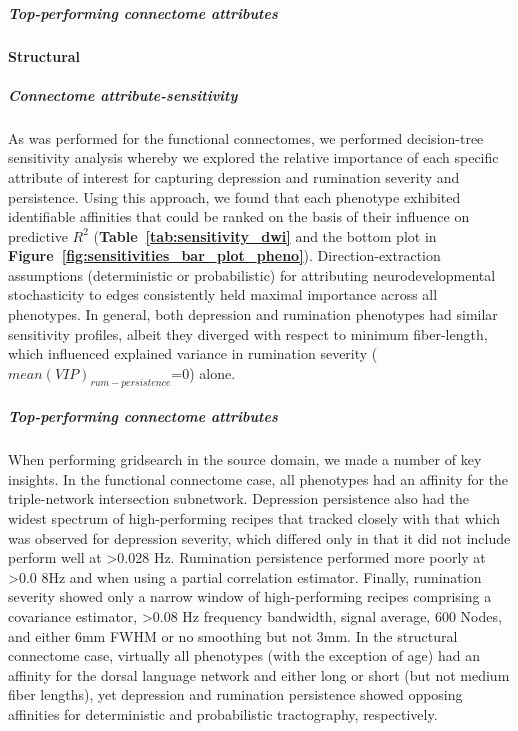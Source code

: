 \documentclass[
  notitlepage]{article}
\begin{document}
\hypertarget{top-performing-connectome-attributes}{%
\subparagraph{Top-performing connectome
attributes}\label{top-performing-connectome-attributes}}
\hypertarget{structural}{%
\paragraph{Structural}\label{structural}}
\hypertarget{connectome-attribute-sensitivity-1}{%
\subparagraph{Connectome
attribute-sensitivity}\label{connectome-attribute-sensitivity-1}}
As was performed for the functional connectomes, we performed
decision-tree sensitivity analysis whereby we explored the relative
importance of each specific attribute of interest for capturing
depression and rumination severity and persistence. Using this approach,
we found that each phenotype exhibited identifiable affinities that
could be ranked on the basis of their influence on predictive \(R^{2}\)
(\textbf{Table~\ref{tab:sensitivity_dwi}} and the bottom plot in \textbf{Figure~\ref{fig:sensitivities_bar_plot_pheno}}). Direction-extraction
assumptions (deterministic or probabilistic) for attributing
neurodevelopmental stochasticity to edges consistently held maximal
importance across all phenotypes. In general, both depression and
rumination phenotypes had similar sensitivity profiles, albeit they
diverged with respect to minimum fiber-length, which influenced
explained variance in rumination severity
(\(mean(VIP)_{rum-persistence}\)=0) alone.

\hypertarget{top-performing-connectome-attributes-1}{%
\subparagraph{Top-performing connectome
attributes}\label{top-performing-connectome-attributes-1}}
When performing gridsearch in the source domain, we made a number of key
insights. In the functional connectome case, all phenotypes had an
affinity for the triple-network intersection subnetwork. Depression
persistence also had the widest spectrum of high-performing recipes that
tracked closely with that which was observed for depression severity,
which differed only in that it did not include perform well at
\textgreater0.028 Hz. Rumination persistence performed more poorly at
\textgreater0.0 8Hz and when using a partial correlation estimator.
Finally, rumination severity showed only a narrow window of
high-performing recipes comprising a covariance estimator,
\textgreater0.08 Hz frequency bandwidth, signal average, 600 Nodes, and
either 6mm FWHM or no smoothing but not 3mm. In the structural
connectome case, virtually all phenotypes (with the exception of age)
had an affinity for the dorsal language network and either long or short
(but not medium fiber lengths), yet depression and rumination
persistence showed opposing affinities for deterministic and
probabilistic tractography, respectively.
\end{document}
